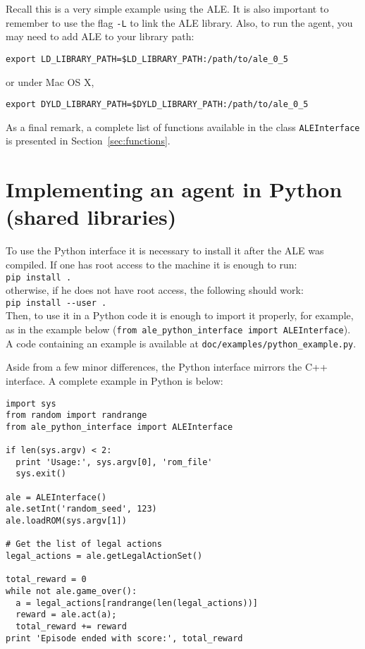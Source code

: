 \documentclass[12pt]{article}
\begin{document}
Recall this is a very simple example using the ALE. It is also important to remember to use the flag 
\verb+-L+ to link the ALE library. Also, to run the agent, you may need to add ALE to your library
path:

\begin{verbatim}
export LD_LIBRARY_PATH=$LD_LIBRARY_PATH:/path/to/ale_0_5
\end{verbatim}

or under Mac OS X,

\begin{verbatim}
export DYLD_LIBRARY_PATH=$DYLD_LIBRARY_PATH:/path/to/ale_0_5
\end{verbatim}

As a final remark, a complete list of functions available in the class \verb+ALEInterface+ is 
presented in Section~\ref{sec:functions}.

\section{Implementing an agent in Python (shared libraries)}\label{sec:python_interface}

To use the Python interface it is necessary to install it after the ALE was compiled. If one has 
root access to the machine it is enough to run:\\

\verb+pip install .+\\

otherwise, if he does not have root access, the following should work:\\

\verb+pip install --user .+\\

Then, to use it in a Python code it is enough to import it properly, for example, as in the 
example below (\verb+from ale_python_interface import ALEInterface+). A code containing
an example is available at \verb+doc/examples/python_example.py+.

Aside from a few minor differences, the Python interface mirrors the C++ interface. A complete example in Python is below:

\begin{verbatim}
import sys
from random import randrange
from ale_python_interface import ALEInterface

if len(sys.argv) < 2:
  print 'Usage:', sys.argv[0], 'rom_file'
  sys.exit()

ale = ALEInterface()
ale.setInt('random_seed', 123)
ale.loadROM(sys.argv[1])

# Get the list of legal actions
legal_actions = ale.getLegalActionSet()

total_reward = 0
while not ale.game_over():
  a = legal_actions[randrange(len(legal_actions))]
  reward = ale.act(a);
  total_reward += reward
print 'Episode ended with score:', total_reward
\end{verbatim}
\end{document}
